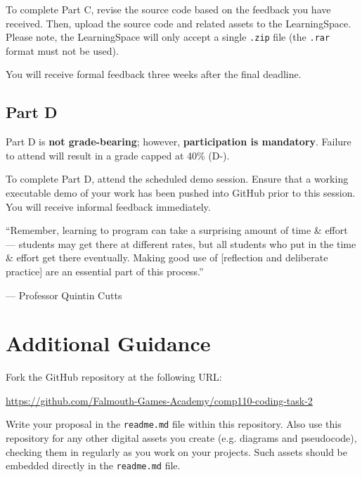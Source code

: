 \documentclass{../fal_assignment}
\begin{document}
To complete Part C, revise the source code based on the feedback you have received. Then, upload the source code and related assets to the LearningSpace. Please note, the LearningSpace will only accept a single \texttt{.zip} file (the \texttt{.rar} format must not be used).

You will receive formal feedback three weeks after the final deadline.

\subsection*{Part D}

Part D is \textbf{not grade-bearing}; however, \textbf{participation is mandatory}. Failure to attend will result in a grade capped at 40\% (D-).

To complete Part D, attend the scheduled demo session. Ensure that a working executable demo of your work has been pushed into GitHub prior to this session. You will receive informal feedback immediately.

\begin{marginquote}
    ``Remember, learning to program can take a surprising amount of time \& effort --- students may get there at different rates, but all students who put in the time \& effort get there eventually. Making good use of [reflection and deliberate practice] are an essential part of this process.''
    
    --- Professor Quintin Cutts
\end{marginquote}

\newpage

\section*{Additional Guidance}

Fork the GitHub repository at the following URL:

\indent \url{https://github.com/Falmouth-Games-Academy/comp110-coding-task-2}

Write your proposal in the \texttt{readme.md} file within this repository. Also use this repository for any other digital assets you create (e.g. diagrams and pseudocode), checking them in regularly as you work on your projects. Such assets should be embedded directly in the \texttt{readme.md} file.
\end{document}
